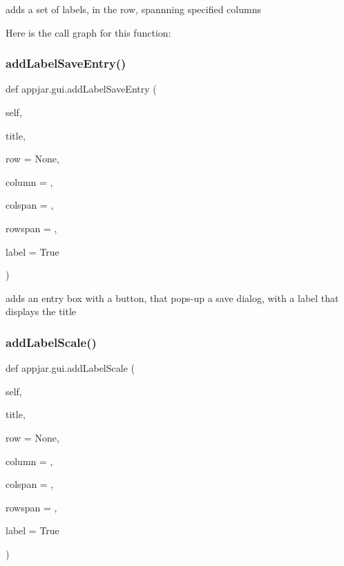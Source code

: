\begin{DoxyVerb}adds a set of labels, in the row, spannning specified columns \end{DoxyVerb}
 Here is the call graph for this function\+:
\mbox{\label{classappjar_1_1gui_a0580477c94b8f68ac15b59f184a356b2}} 
\subsubsection{\texorpdfstring{add\+Label\+Save\+Entry()}{addLabelSaveEntry()}}
{\footnotesize\ttfamily def appjar.\+gui.\+add\+Label\+Save\+Entry (\begin{DoxyParamCaption}\item[{}]{self,  }\item[{}]{title,  }\item[{}]{row = {\ttfamily None},  }\item[{}]{column = {},  }\item[{}]{colspan = {},  }\item[{}]{rowspan = {},  }\item[{}]{label = {\ttfamily True} }\end{DoxyParamCaption})}

\begin{DoxyVerb}adds an entry box with a button, that pops-up a save dialog, with a label that displays the title \end{DoxyVerb}
 \mbox{\label{classappjar_1_1gui_a7c14eb8e24cb016be967441d45e8c4bc}} 
\subsubsection{\texorpdfstring{add\+Label\+Scale()}{addLabelScale()}}
{\footnotesize\ttfamily def appjar.\+gui.\+add\+Label\+Scale (\begin{DoxyParamCaption}\item[{}]{self,  }\item[{}]{title,  }\item[{}]{row = {\ttfamily None},  }\item[{}]{column = {},  }\item[{}]{colspan = {},  }\item[{}]{rowspan = {},  }\item[{}]{label = {\ttfamily True} }\end{DoxyParamCaption})}


